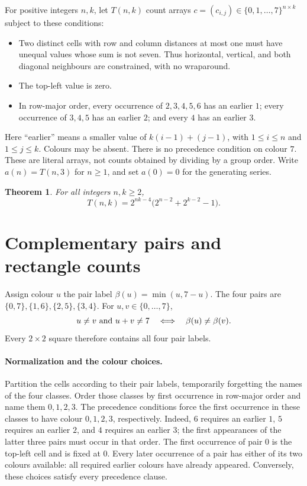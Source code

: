 \documentclass[11pt]{article}
\newtheorem{theorem}{Theorem}
\begin{document}
For positive integers $n,k$, let $T(n,k)$ count arrays
$c=(c_{i,j})\in\{0,1,\ldots,7\}^{n\times k}$ subject to these conditions:
\begin{itemize}
\item Two distinct cells with row and column distances at most one must
have unequal values whose sum is not seven. Thus horizontal, vertical,
and both diagonal neighbours are constrained, with no wraparound.
\item The top-left value is zero.
\item In row-major order, every occurrence of $2,3,4,5,6$ has an earlier $1$;
every occurrence of $3,4,5$ has an earlier $2$; and every $4$ has an earlier $3$.
\end{itemize}
Here ``earlier'' means a smaller value of $k(i-1)+(j-1)$, with
$1\leq i\leq n$ and $1\leq j\leq k$. Colours may be absent.
There is no precedence condition on colour $7$.
These are literal arrays, not counts obtained by dividing by a group order.
Write $a(n)=T(n,3)$ for $n\geq1$, and set $a(0)=0$ for the generating series.

\begin{theorem}\label{thm:rectangle}
For all integers $n,k\geq2$,
\begin{equation}\label{eq:rectangle}
 T(n,k)=2^{nk-4}\bigl(2^{n-2}+2^{k-2}-1\bigr).
\end{equation}
\end{theorem}

\section{Complementary pairs and rectangle counts}

Assign colour $u$ the pair label $\beta(u)=\min(u,7-u)$.
The four pairs are $\{0,7\},\{1,6\},\{2,5\},\{3,4\}$.
For $u,v\in\{0,\ldots,7\}$,
\[
 u\ne v\ \hbox{and}\ u+v\ne7
 \quad\Longleftrightarrow\quad \beta(u)\ne\beta(v).
\]
Every $2\times2$ square therefore contains all four pair labels.

\paragraph{Normalization and the colour choices.}
Partition the cells according to their pair labels, temporarily forgetting
the names of the four classes. Order those classes by first occurrence
in row-major order and name them $0,1,2,3$.
The precedence conditions force the first occurrence in these classes
to have colour $0,1,2,3$, respectively. Indeed, $6$ requires an earlier $1$,
$5$ requires an earlier $2$, and $4$ requires an earlier $3$; the first
appearances of the latter three pairs must occur in that order.
The first occurrence of pair $0$ is the top-left cell and is fixed at $0$.
Every later occurrence of a pair has either of its two colours available:
all required earlier colours have already appeared. Conversely, these
choices satisfy every precedence clause.
\end{document}
